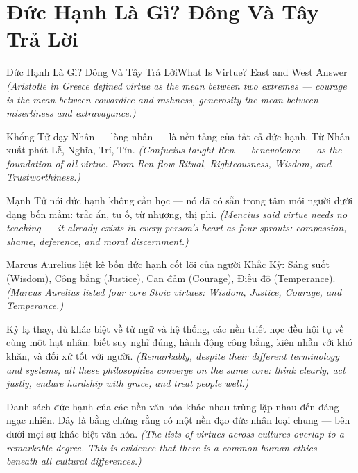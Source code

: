 \section{Đức Hạnh Là Gì? Đông Và Tây Trả Lời}
\begin{truyen}{Đức Hạnh Là Gì? Đông Và Tây Trả Lời}{What Is Virtue? East and West Answer}
\textit{(Aristotle in Greece defined virtue as the mean between two extremes — courage is the mean between cowardice and rashness, generosity the mean between miserliness and extravagance.)}

Khổng Tử dạy Nhân — lòng nhân — là nền tảng của tất cả đức hạnh. Từ Nhân xuất phát Lễ, Nghĩa, Trí, Tín.
\textit{(Confucius taught Ren — benevolence — as the foundation of all virtue. From Ren flow Ritual, Righteousness, Wisdom, and Trustworthiness.)}

Mạnh Tử nói đức hạnh không cần học — nó đã có sẵn trong tâm mỗi người dưới dạng bốn mầm: trắc ẩn, tu ố, từ nhượng, thị phi.
\textit{(Mencius said virtue needs no teaching — it already exists in every person's heart as four sprouts: compassion, shame, deference, and moral discernment.)}

Marcus Aurelius liệt kê bốn đức hạnh cốt lõi của người Khắc Kỷ: Sáng suốt (Wisdom), Công bằng (Justice), Can đảm (Courage), Điều độ (Temperance).
\textit{(Marcus Aurelius listed four core Stoic virtues: Wisdom, Justice, Courage, and Temperance.)}

Kỳ lạ thay, dù khác biệt về từ ngữ và hệ thống, các nền triết học đều hội tụ về cùng một hạt nhân: biết suy nghĩ đúng, hành động công bằng, kiên nhẫn với khó khăn, và đối xử tốt với người.
\textit{(Remarkably, despite their different terminology and systems, all these philosophies converge on the same core: think clearly, act justly, endure hardship with grace, and treat people well.)}

\end{truyen}

\begin{baihoc}
Danh sách đức hạnh của các nền văn hóa khác nhau trùng lặp nhau đến đáng ngạc nhiên. Đây là bằng chứng rằng có một nền đạo đức nhân loại chung — bên dưới mọi sự khác biệt văn hóa.
\textit{(The lists of virtues across cultures overlap to a remarkable degree. This is evidence that there is a common human ethics — beneath all cultural differences.)}
\end{baihoc}
\ngancach

